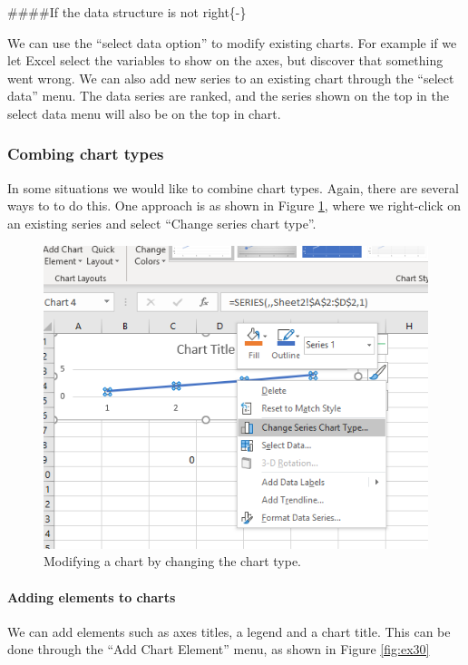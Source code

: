 \documentclass[]{book}
\let\oldparagraph\paragraph
\renewcommand{\paragraph}[1]{\oldparagraph{#1}\mbox{}}
\begin{document}
\#\#\#\#If the data structure is not right\{-\}

We can use the ``select data option'' to modify existing charts. For example if we let Excel select the variables to show on the axes, but discover that something went wrong. We can also add new series to an existing chart through the ``select data'' menu. The data series are ranked, and the series shown on the top in the select data menu will also be on the top in chart.

\hypertarget{combing-chart-types}{%
\subsubsection*{Combing chart types}\label{combing-chart-types}}

In some situations we would like to combine chart types. Again, there are several ways to to do this. One approach is as shown in Figure \ref{fig:ex29}, where we right-click on an existing series and select ``Change series chart type''.

\begin{figure}

{\centering \includegraphics[width=0.6\linewidth]{_resources/chapter_excelbasic/change1} 

}

\caption{Modifying a chart by changing the chart type.}\label{fig:ex29}
\end{figure}

\paragraph{Adding elements to charts}

We can add elements such as axes titles, a legend and a chart title. This can be done through the ``Add Chart Element'' menu, as shown in Figure \ref{fig:ex30}
\end{document}

